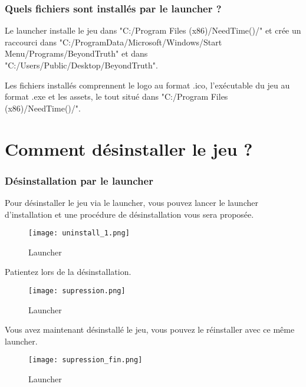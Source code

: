 \documentclass[
	article,			%
	11pt,				%
	oneside,			%
	a4paper,			%
	chapter=TITLE,
	french,			%
	sumario=tradicional
	]{base_nt}
\begin{document}
\section{Quels fichiers sont installés par le launcher ?}

Le launcher installe le jeu dans "C:/Program Files (x86)/NeedTime()/" et crée un raccourci dans "C:/ProgramData/Microsoft/Windows/Start Menu/Programs/BeyondTruth" et dans "C:/Users/Public/Desktop/BeyondTruth".

Les fichiers installés comprennent le logo au format .ico, l'exécutable du jeu au format .exe et les assets, le tout situé dans "C:/Program Files (x86)/NeedTime()/".

\newpage

\part{Comment désinstaller le jeu ?}

\section{Désinstallation par le launcher}

Pour désinstaller le jeu via le launcher, vous pouvez lancer le launcher d'installation et une procédure de désinstallation vous sera proposée.

\begin{figure}[ht]
    \caption{Launcher}
    \centering
    \texttt{[image: uninstall\_1.png]}
    	
\end{figure}

\newpage

Patientez lors de la désinstallation.

\begin{figure}[ht]
    \caption{Launcher}
    \centering
    \texttt{[image: supression.png]}
    	
\end{figure}

\newpage

Vous avez maintenant désinstallé le jeu, vous pouvez le réinstaller avec ce même launcher.

\begin{figure}[ht]
    \caption{Launcher}
    \centering
    \texttt{[image: supression\_fin.png]}
    	
\end{figure}
\end{document}
